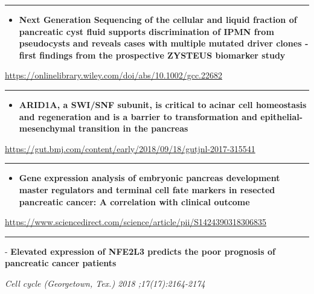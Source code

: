 \documentclass[]{article}
\providecommand{\tightlist}{%
  \setlength{\itemsep}{0pt}\setlength{\parskip}{0pt}}
\begin{document}
\begin{center}\rule{0.5\linewidth}{\linethickness}\end{center}

\begin{itemize}
\tightlist
\item
  \textbf{Next Generation Sequencing of the cellular and liquid fraction
  of pancreatic cyst fluid supports discrimination of IPMN from
  pseudocysts and reveals cases with multiple mutated driver clones ‐
  first findings from the prospective ZYSTEUS biomarker study}
\end{itemize}

\url{https://onlinelibrary.wiley.com/doi/abs/10.1002/gcc.22682}

\begin{center}\rule{0.5\linewidth}{\linethickness}\end{center}

\begin{itemize}
\tightlist
\item
  \textbf{ARID1A, a SWI/SNF subunit, is critical to acinar cell
  homeostasis and regeneration and is a barrier to transformation and
  epithelial-mesenchymal transition in the pancreas}
\end{itemize}

\url{https://gut.bmj.com/content/early/2018/09/18/gutjnl-2017-315541}

\begin{center}\rule{0.5\linewidth}{\linethickness}\end{center}

\begin{itemize}
\tightlist
\item
  \textbf{Gene expression analysis of embryonic pancreas development
  master regulators and terminal cell fate markers in resected
  pancreatic cancer: A correlation with clinical outcome}
\end{itemize}

\url{https://www.sciencedirect.com/science/article/pii/S1424390318306835}

\begin{center}\rule{0.5\linewidth}{\linethickness}\end{center}

 - \textbf{Elevated expression of NFE2L3 predicts the poor prognosis of
pancreatic cancer patients}

\emph{Cell cycle (Georgetown, Tex.) 2018 ;17(17):2164-2174}
\end{document}
